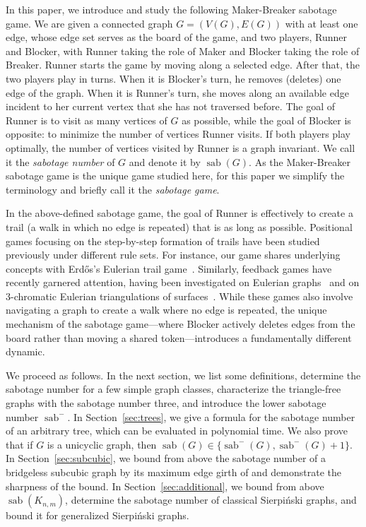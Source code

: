 \documentclass[12pt]{article}
\DeclareMathOperator{\sab}{\mathrm{sab}}
\begin{document}
In this paper, we introduce and study the following Maker-Breaker sabotage game. We are given a connected graph $G = (V(G), E(G))$ with at least one edge, whose edge set serves as the board of the game, and two players, Runner and Blocker, with Runner taking the role of Maker and Blocker taking the role of Breaker. Runner starts the game by moving along a selected edge. After that, the two players play in turns. When it is Blocker's turn, he removes (deletes) one edge of the graph. When it is Runner's turn, she moves along an available edge incident to her current vertex that she has not traversed before. The goal of Runner is to visit as many vertices of $G$ as possible, while the goal of Blocker is opposite: to minimize the number of vertices Runner visits. If both players play optimally, the number of vertices visited by Runner is a graph invariant. We call it the \emph{sabotage number} of $G$ and denote it by $\sab(G)$. As the Maker-Breaker sabotage game is the unique game studied here, for this paper we simplify the terminology and briefly call it the {\em sabotage game}. 

In the above-defined sabotage game, the goal of Runner is effectively to create a trail (a walk in which no edge is repeated) that is as long as possible. Positional games focusing on the step-by-step formation of trails have been studied previously under different rule sets. For instance, our game shares underlying concepts with Erd\H{o}s's Eulerian trail game~\cite{seress-1999}. Similarly, feedback games have recently garnered attention, having been investigated on Eulerian graphs~\cite{matsumoto-2023} and on 3-chromatic Eulerian triangulations of surfaces~\cite{higashi-2024}. While these games also involve navigating a graph to create a walk where no edge is repeated, the unique mechanism of the sabotage game---where Blocker actively deletes edges from the board rather than moving a shared token---introduces a fundamentally different dynamic.

We proceed as follows. In the next section, we list some definitions, determine the sabotage number for a few simple graph classes, characterize the triangle-free graphs with the sabotage number three, and introduce the lower sabotage number $\sab^-$. In Section~\ref{sec:trees}, we give a formula for the sabotage number of an arbitrary tree, which can be evaluated in polynomial time. We also prove that if $G$ is a unicyclic graph, then $\sab(G)\in \{\sab^-(G), \sab^-(G)+1\}$. In Section~\ref{sec:subcubic}, we bound from above the sabotage number of a bridgeless subcubic graph by its maximum edge girth of and demonstrate the sharpness of the bound. In Section~\ref{sec:additional}, we bound from above $\sab(K_{n,m})$, determine the sabotage number of classical Sierpi\'nski graphs, and bound it for generalized Sierpi\'nski graphs.  
\end{document}
